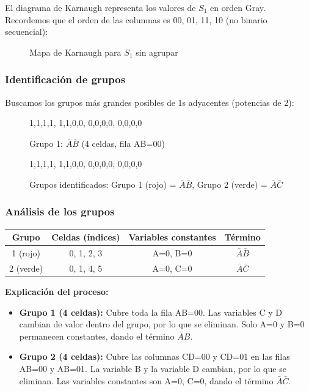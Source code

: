 \documentclass[11pt,a4paper]{article}
\begin{document}
El diagrama de Karnaugh representa los valores de $S_1$ en orden Gray. Recordemos que el orden de las columnas es 00, 01, 11, 10 (no binario secuencial):

\begin{figure}[H]
\centering
{}
\caption{Mapa de Karnaugh para $S_1$ sin agrupar}
\end{figure}

\subsubsection*{Identificación de grupos}

Buscamos los grupos más grandes posibles de 1s adyacentes (potencias de 2):

\begin{figure}[H]
\centering
{}%
  {1,1,1,1, 1,1,0,0, 0,0,0,0, 0,0,0,0}%
  {%
  }
\caption{Grupo 1: $\bar{A}\bar{B}$ (4 celdas, fila AB=00)}
\end{figure}

\begin{figure}[H]
\centering
{}%
  {1,1,1,1, 1,1,0,0, 0,0,0,0, 0,0,0,0}%
  {%
  }
\caption{Grupos identificados: Grupo 1 (rojo) = $\bar{A}\bar{B}$, Grupo 2 (verde) = $\bar{A}\bar{C}$}
\end{figure}

\subsubsection*{Análisis de los grupos}

\begin{center}
\begin{tabular}{|c|c|c|c|}
\hline
\textbf{Grupo} & \textbf{Celdas (índices)} & \textbf{Variables constantes} & \textbf{Término} \\
\hline
1 (rojo) & 0, 1, 2, 3 & A=0, B=0 & $\bar{A}\bar{B}$ \\
\hline
2 (verde) & 0, 1, 4, 5 & A=0, C=0 & $\bar{A}\bar{C}$ \\
\hline
\end{tabular}
\end{center}

\textbf{Explicación del proceso:}
\begin{itemize}
    \item \textbf{Grupo 1 (4 celdas):} Cubre toda la fila AB=00. Las variables C y D cambian de valor dentro del grupo, por lo que se eliminan. Solo A=0 y B=0 permanecen constantes, dando el término $\bar{A}\bar{B}$.
    \item \textbf{Grupo 2 (4 celdas):} Cubre las columnas CD=00 y CD=01 en las filas AB=00 y AB=01. La variable B y la variable D cambian, por lo que se eliminan. Las variables constantes son A=0, C=0, dando el término $\bar{A}\bar{C}$.
\end{itemize}
\end{document}
